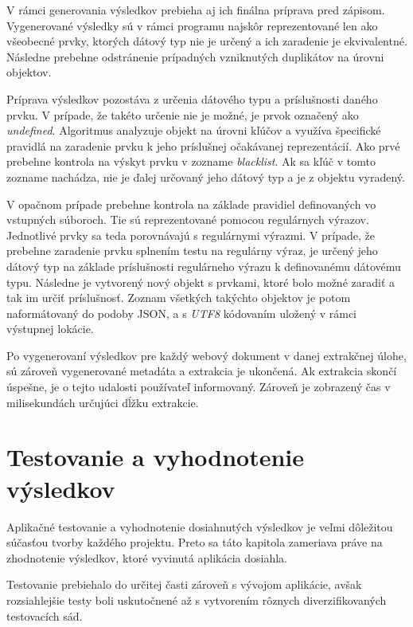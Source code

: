V rámci generovania výsledkov prebieha aj ich finálna príprava pred zápisom. Vygenerované výsledky sú v rámci programu najskôr reprezentované len ako všeobecné prvky, ktorých dátový typ nie je určený a ich zaradenie je ekvivalentné. Následne prebehne odstránenie prípadných vzniknutých duplikátov na úrovni objektov. 

Príprava výsledkov pozostáva z určenia dátového typu a príslušnosti daného prvku. V prípade, že takéto určenie nie je možné, je prvok označený ako \textit{undefined}. Algoritmus analyzuje objekt na úrovni kľúčov a využíva špecifické pravidlá na zaradenie prvku k jeho príslušnej očakávanej reprezentácií. Ako prvé prebehne kontrola na výskyt prvku v zozname \textit{blacklist}. Ak sa kľúč v tomto zozname nachádza, nie je ďalej určovaný jeho dátový typ a je z objektu vyradený. 

V opačnom prípade prebehne kontrola na základe pravidiel definovaných vo vstupných súboroch. Tie sú reprezentované pomocou regulárnych výrazov. Jednotlivé prvky sa teda porovnávajú s regulárnymi výrazmi. V prípade, že prebehne zaradenie prvku splnením testu na regulárny výraz, je určený jeho dátový typ na základe príslušnosti regulárneho výrazu k definovanému dátovému typu. Následne je vytvorený nový objekt s prvkami, ktoré bolo možné zaradiť a tak im určiť príslušnosť. Zoznam všetkých takýchto objektov je potom naformátovaný do podoby JSON, a s \textit{UTF8} kódovaním uložený v rámci výstupnej lokácie. 

\bigskip

Po vygenerovaní výsledkov pre každý webový dokument v danej extrakčnej úlohe, sú zároveň vygenerované metadáta a extrakcia je ukončená. Ak extrakcia skončí úspešne, je o tejto udalosti používateľ informovaný. Zároveň je zobrazený čas v milisekundách určujúci dĺžku extrakcie.

\chapter{Testovanie a vyhodnotenie výsledkov}
\label{testing}

Aplikačné testovanie a vyhodnotenie dosiahnutých výsledkov je veľmi dôležitou súčasťou tvorby každého projektu. Preto sa táto kapitola zameriava práve na zhodnotenie výsledkov, ktoré vyvinutá aplikácia dosiahla. 

Testovanie prebiehalo do určitej časti zároveň s vývojom aplikácie, avšak rozsiahlejšie testy boli uskutočnené až s vytvorením rôznych diverzifikovaných testovacích sád.


